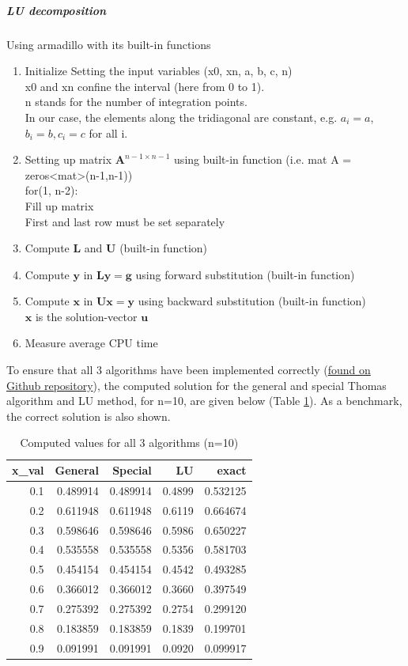 \documentclass[%
oneside,                 %
final,                   %
10pt]{article}
\begin{document}
\subparagraph{LU decomposition}
Using armadillo with its built-in functions
\begin{enumerate}
\item Initialize Setting the input variables (x0, xn, a, b, c, n) \\
	x0 and xn confine the interval (here from 0 to 1). \\
	n stands for the number of integration points. \\
	In our case, the elements along the tridiagonal are constant, e.g. $a_i=a$, $b_i=b, c_i=c$ for all i. 

\item Setting up matrix $\mathbf{A}^{n-1 \times n-1}$ using built-in function (i.e. mat A = zeros<mat>(n-1,n-1))\\
	 for(1, n-2): \\
	 Fill up matrix \\
	 First and last row must be set separately
		
\item Compute $\mathbf{L}$ and $\mathbf{U}$ (built-in function)

\item Compute $\mathbf{y}$ in $\mathbf{Ly}=\mathbf{g}$ using forward substitution (built-in function)

\item Compute $\mathbf{x}$ in $\mathbf{Ux}=\mathbf{y}$ using backward substitution (built-in function)\\
		$\mathbf{x}$ is the solution-vector $\mathbf{u}$ 

\item Measure average CPU time		
\end{enumerate}
To ensure that all 3 algorithms have been implemented correctly
(\href{https://github.com/EliasTRuud/FYS3150/tree/master/Project1}{found on Github repository}),
the computed solution for the general and special Thomas algorithm and LU method, for n=10, are given below (Table \ref{tbl:Values_n10}). As a benchmark, the correct solution is also shown.
\begin{table}[H]
\caption{Computed values for all 3 algorithms (n=10)}
\centering
\begin{tabular}{rrrrr}
\toprule
 x\_val &  General &  Special &   LU &   exact \\
\midrule
  0.1 & 0.489914 & 0.489914 & 0.4899 & 0.532125 \\
  0.2 & 0.611948 & 0.611948 & 0.6119 & 0.664674 \\
  0.3 & 0.598646 & 0.598646 & 0.5986 & 0.650227 \\
  0.4 & 0.535558 & 0.535558 & 0.5356 & 0.581703 \\
  0.5 & 0.454154 & 0.454154 & 0.4542 & 0.493285 \\
  0.6 & 0.366012 & 0.366012 & 0.3660 & 0.397549 \\
  0.7 & 0.275392 & 0.275392 & 0.2754 & 0.299120 \\
  0.8 & 0.183859 & 0.183859 & 0.1839 & 0.199701 \\
  0.9 & 0.091991 & 0.091991 & 0.0920 & 0.099917 \\
\bottomrule
\end{tabular}
\label{tbl:Values_n10}
\end{table}
\end{document}
